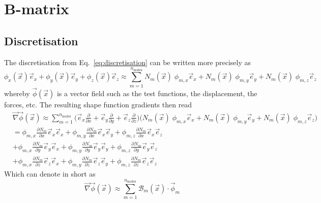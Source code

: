 \documentclass[times,namecite]{goose-article}
\begin{document}
\section{B-matrix}

\subsection{Discretisation}

The discretisation from Eq.~\eqref{eq:discretisation} can be written more precisely as
\begin{equation}
  \phi_x(\vec{x}) \vec{e}_x +
  \phi_y(\vec{x}) \vec{e}_y +
  \phi_z(\vec{x}) \vec{e}_z
  \approx
  \sum_{m=1}^{n_\mathrm{nodes}}
  N_m (\vec{x}) \; \phi_{m,x} \vec{e}_x +
  N_m (\vec{x}) \; \phi_{m,y} \vec{e}_y +
  N_m (\vec{x}) \; \phi_{m,z} \vec{e}_z
\end{equation}
whereby $\vec{\phi}(\vec{x})$ is a vector field such as the test functions, the displacement, the forces, etc. The resulting shape function gradients then read
\begin{align}
  &
  \vec{\nabla} \vec{\phi}(\vec{x})
  \approx
  \sum_{m=1}^{n_\mathrm{nodes}}
  \bigg(
    \vec{e}_x \frac{\partial}{\partial x} +
    \vec{e}_y \frac{\partial}{\partial y} +
    \vec{e}_z \frac{\partial}{\partial z}
  \bigg)
  \bigg(
    N_m (\vec{x}) \; \phi_{m,x} \vec{e}_x +
    N_m (\vec{x}) \; \phi_{m,y} \vec{e}_y +
    N_m (\vec{x}) \; \phi_{m,z} \vec{e}_z
  \bigg)
  \\
  &
  =
  \phi_{m,x} \frac{\partial N_m}{\partial x} \vec{e}_x \vec{e}_x + \nonumber
  \phi_{m,y} \frac{\partial N_m}{\partial x} \vec{e}_x \vec{e}_y + \nonumber
  \phi_{m,z} \frac{\partial N_m}{\partial x} \vec{e}_x \vec{e}_z
  \\
  &
  +
  \phi_{m,x} \frac{\partial N_m}{\partial y} \vec{e}_y \vec{e}_x +
  \phi_{m,y} \frac{\partial N_m}{\partial y} \vec{e}_y \vec{e}_y +
  \phi_{m,z} \frac{\partial N_m}{\partial y} \vec{e}_y \vec{e}_z
  \\
  &
  +
  \phi_{m,x} \frac{\partial N_m}{\partial z} \vec{e}_z \vec{e}_x +
  \phi_{m,y} \frac{\partial N_m}{\partial z} \vec{e}_z \vec{e}_y +
  \phi_{m,z} \frac{\partial N_m}{\partial z} \vec{e}_z \vec{e}_z
\end{align}
Which can denote in short as
\begin{equation}
\label{eq:bmatrix:discretisation}
  \vec{\nabla} \vec{\phi} (\vec{x})
  \approx
  \sum_{m=1}^{n_\mathrm{nodes}}
  \mathcal{B}_m (\vec{x}) \cdot \vec{\phi}_m
\end{equation}
\end{document}
